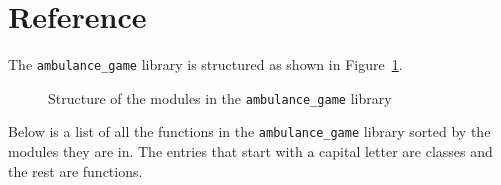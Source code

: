 \section{Reference}\label{sec:ambulance_game_reference}


The \texttt{ambulance\_game} library is structured as shown in
Figure~\ref{fig:ambulance_game_structure}.

\begin{figure}[H]
    \caption{Structure of the modules in the \texttt{ambulance\_game} library}
    \label{fig:ambulance_game_structure}
\end{figure}


Below is a list of all the functions in the \texttt{ambulance\_game} library
sorted by the modules they are in.
The entries that start with a capital letter are classes and the rest are
functions.

